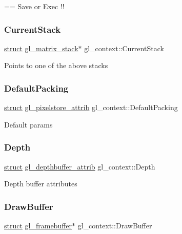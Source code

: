 == Save or Exec !! \mbox{\label{structgl__context_ab49feb8f976150ad03e8da17a98fe06c}} 
\subsubsection{\texorpdfstring{Current\+Stack}{CurrentStack}}
{\footnotesize\ttfamily \hyperlink{interfacestruct}{struct} \hyperlink{structgl__matrix__stack}{gl\+\_\+matrix\+\_\+stack}$\ast$ gl\+\_\+context\+::\+Current\+Stack}

Points to one of the above stacks \mbox{\label{structgl__context_a63ee4ec4dd075917d69cf89339f82761}} 
\subsubsection{\texorpdfstring{Default\+Packing}{DefaultPacking}}
{\footnotesize\ttfamily \hyperlink{interfacestruct}{struct} \hyperlink{structgl__pixelstore__attrib}{gl\+\_\+pixelstore\+\_\+attrib} gl\+\_\+context\+::\+Default\+Packing}

Default params \mbox{\label{structgl__context_a1e53e365f8c2e4b1677d37421fe3ab1e}} 
\subsubsection{\texorpdfstring{Depth}{Depth}}
{\footnotesize\ttfamily \hyperlink{interfacestruct}{struct} \hyperlink{structgl__depthbuffer__attrib}{gl\+\_\+depthbuffer\+\_\+attrib} gl\+\_\+context\+::\+Depth}

Depth buffer attributes \mbox{\label{structgl__context_a69a6afef6a63b78db5e101c8bc0de3c0}} 
\subsubsection{\texorpdfstring{Draw\+Buffer}{DrawBuffer}}
{\footnotesize\ttfamily \hyperlink{interfacestruct}{struct} \hyperlink{structgl__framebuffer}{gl\+\_\+framebuffer}$\ast$ gl\+\_\+context\+::\+Draw\+Buffer}

